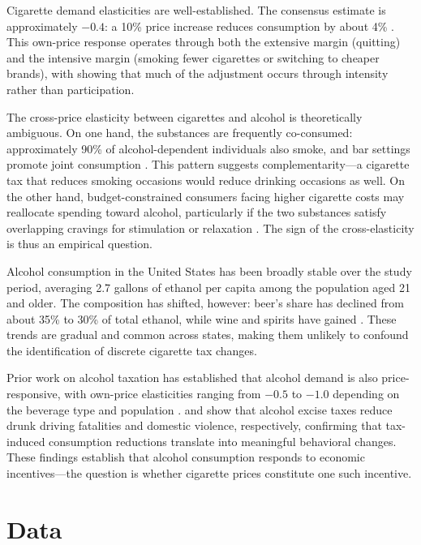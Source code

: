 \documentclass[12pt]{article}
\begin{document}
Cigarette demand elasticities are well-established. The consensus estimate is approximately $-0.4$: a 10\% price increase reduces consumption by about 4\% \citep{chaloupka2002economics}. This own-price response operates through both the extensive margin (quitting) and the intensive margin (smoking fewer cigarettes or switching to cheaper brands), with \citet{adda2007taxes} showing that much of the adjustment occurs through intensity rather than participation.

The cross-price elasticity between cigarettes and alcohol is theoretically ambiguous. On one hand, the substances are frequently co-consumed: approximately 90\% of alcohol-dependent individuals also smoke, and bar settings promote joint consumption \citep{cook2007relationship}. This pattern suggests complementarity---a cigarette tax that reduces smoking occasions would reduce drinking occasions as well. On the other hand, budget-constrained consumers facing higher cigarette costs may reallocate spending toward alcohol, particularly if the two substances satisfy overlapping cravings for stimulation or relaxation \citep{decker2000cigarettes}. The sign of the cross-elasticity is thus an empirical question.

Alcohol consumption in the United States has been broadly stable over the study period, averaging 2.7 gallons of ethanol per capita among the population aged 21 and older. The composition has shifted, however: beer's share has declined from about 35\% to 30\% of total ethanol, while wine and spirits have gained \citep{gallet2007demand}. These trends are gradual and common across states, making them unlikely to confound the identification of discrete cigarette tax changes.

Prior work on alcohol taxation has established that alcohol demand is also price-responsive, with own-price elasticities ranging from $-0.5$ to $-1.0$ depending on the beverage type and population \citep{manning1995demand, gallet2007demand}. \citet{dee1999state} and \citet{markowitz2005alcohol} show that alcohol excise taxes reduce drunk driving fatalities and domestic violence, respectively, confirming that tax-induced consumption reductions translate into meaningful behavioral changes. These findings establish that alcohol consumption responds to economic incentives---the question is whether cigarette prices constitute one such incentive.

\section{Data}
\label{sec:data}
\end{document}
